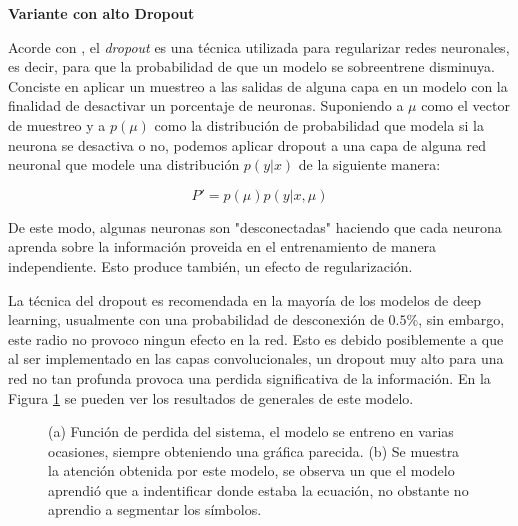\vspace{1em}
\textbf{Variante con alto Dropout}
\vspace{1em}

Acorde con \cite{deeplearningbook}, el \textit{dropout} es una técnica utilizada para regularizar redes neuronales, es decir, para que la probabilidad de que un modelo se sobreentrene disminuya. Conciste en aplicar un muestreo a las salidas de alguna capa en un modelo con la finalidad de desactivar un porcentaje de neuronas. Suponiendo a $\mu$ como el vector de muestreo y a $p(\mu)$ como la distribución de probabilidad que modela si la neurona se desactiva o no, podemos aplicar dropout a una capa de alguna red neuronal que modele una distribución $p(y|x)$ de la siguiente manera:

\begin{equation}
    P' = p(\mu)p(y|x,\mu)
\end{equation}

De este modo, algunas neuronas \cite{harvard} son "desconectadas" haciendo que cada neurona aprenda sobre la información proveida en el entrenamiento de manera independiente. Esto produce también, un efecto de regularización.

La técnica del dropout es recomendada en la mayoría de los modelos de deep learning, usualmente con una probabilidad de desconexión de $0.5\%$, sin embargo, este radio no provoco ningun efecto en la red. Esto es debido posiblemente a que al ser implementado en las capas convolucionales, un dropout muy alto para una red no tan profunda provoca una perdida significativa de la información. En la Figura \ref{fig:dropout-bad} se pueden ver los resultados de generales de este modelo.



\begin{figure}[H]
    \centering
    \caption{(a) Función de perdida del sistema, el modelo se entreno en varias ocasiones, siempre obteniendo una gráfica parecida. (b) Se muestra la atención obtenida por este modelo, se observa un que el modelo aprendió que a indentificar donde estaba la ecuación, no obstante no aprendio a segmentar los símbolos.}
    \label{fig:dropout-bad}
\end{figure}

 







